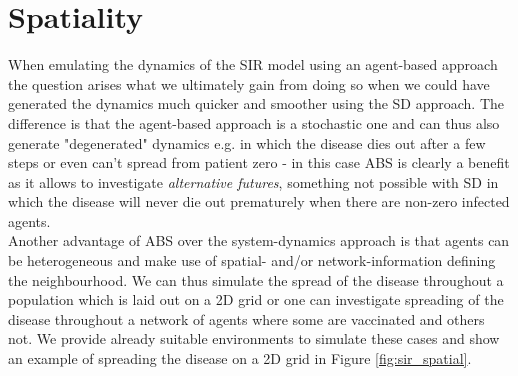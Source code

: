 \section{Spatiality}
When emulating the dynamics of the SIR model using an agent-based approach the question arises what we ultimately gain from doing so when we could have generated the dynamics much quicker and smoother using the SD approach. The difference is that the agent-based approach is a stochastic one and can thus also generate "degenerated" dynamics e.g. in which the disease dies out after a few steps or even can't spread from patient zero - in this case ABS is clearly a benefit as it allows to investigate \textit{alternative futures}, something not possible with SD in which the disease will never die out prematurely when there are non-zero infected agents. \\
Another advantage of ABS over the system-dynamics approach is that agents can be heterogeneous and make use of spatial- and/or network-information defining the neighbourhood. We can thus simulate the spread of the disease throughout a population which is laid out on a 2D grid or one can investigate spreading of the disease throughout a network of agents where some are vaccinated and others not. We provide already suitable environments to simulate these cases and show an example of spreading the disease on a 2D grid in Figure \ref{fig:sir_spatial}.  

